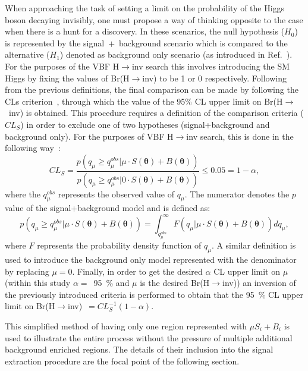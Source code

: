 \hspace{10pt} When approaching the task of setting a limit on the probability of the Higgs boson decaying invisibly, one must propose a way of thinking opposite to the case when there is a hunt for a discovery. In these scenarios, the null hypothesis ($H_0$) is represented by the signal~$+$~background scenario which is compared to the alternative ($H_1$) denoted as background only scenario (as introduced in Ref.~\cite{paper:stat_overview}). For the purposes of the VBF H$\rightarrow$inv search this involves introducing the SM Higgs by fixing the values of Br(H$\rightarrow$inv) to be 1 or 0 respectively. Following from the previous definitions, the final comparison can be made by following the CLs criterion~\cite{paper:stat_overview,paper:cls_intro}, through which the value of the 95\% CL upper limit on Br(H$\rightarrow$~inv) is obtained. This procedure requires a definition of the comparison criteria ($CL_{S}$) in order to exclude one of two hypotheses (signal+background and background only). For the purposes of VBF H$\rightarrow$inv search, this is done in the following way~\cite{Patrick,Riccardo}:
\begin{equation}
    CL_{S} = \frac{p\left (q_{\mu}\geq q_{\mu}^{obs}|\mu \cdot S(\boldsymbol{\theta})+B(\boldsymbol{\theta})\right)}{p\left (q_{\mu}\geq q_{\mu}^{obs}|0\cdot S(\boldsymbol{\theta})+B(\boldsymbol{\theta})\right)} \leq 0.05 = 1-\alpha, 
\end{equation}
where the $q_{\mu}^{obs}$ represents the observed value of $q_{\mu}$. The numerator denotes the $p$ value of the signal+background model and is defined as: 
\begin{equation}
    p\left (q_{\mu}\geq q_{\mu}^{obs}|\mu \cdot S(\boldsymbol{\theta})+B(\boldsymbol{\theta})\right) = \int_{q_{\mu}^{obs}}^{\infty}F\left (q_{\mu}|\mu \cdot S(\boldsymbol{\theta})+B(\boldsymbol{\theta})\right ) dq_{\mu},
\end{equation}
where $F$ represents the probability density function of $q_{\mu}$. A similar definition is used to introduce the background only model represented with the denominator by replacing $\mu = 0$. Finally, in order to get the desired $\alpha$ CL upper limit on $\mu$ (within this study $\alpha =$~95~\% and $\mu$ is the desired Br(H$\rightarrow$inv)) an inversion of the previously introduced criteria is performed to obtain that the 95~\% CL upper limit on Br(H$\rightarrow$inv)~$ = CL_{S}^{-1}(1-\alpha)$.

\hspace{10pt} This simplified method of having only one region represented with $\mu S_i+B_i$ is used to illustrate the entire process without the pressure of multiple additional background enriched regions. The details of their inclusion into the signal extraction procedure are the focal point of the following section.
